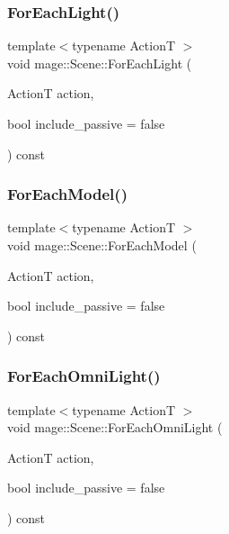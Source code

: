 \hypertarget{classmage_1_1_scene_a7ef0664366aa29c4dff89329d3fb5759}{}\label{classmage_1_1_scene_a7ef0664366aa29c4dff89329d3fb5759} 
\subsubsection{\texorpdfstring{For\+Each\+Light()}{ForEachLight()}}
{\footnotesize\ttfamily template$<$typename ActionT $>$ \\
void mage\+::\+Scene\+::\+For\+Each\+Light (\begin{DoxyParamCaption}\item[{ActionT}]{action,  }\item[{bool}]{include\+\_\+passive = {\ttfamily false} }\end{DoxyParamCaption}) const}

\hypertarget{classmage_1_1_scene_a6df0662b829691415f50ea1d45341582}{}\label{classmage_1_1_scene_a6df0662b829691415f50ea1d45341582} 
\subsubsection{\texorpdfstring{For\+Each\+Model()}{ForEachModel()}}
{\footnotesize\ttfamily template$<$typename ActionT $>$ \\
void mage\+::\+Scene\+::\+For\+Each\+Model (\begin{DoxyParamCaption}\item[{ActionT}]{action,  }\item[{bool}]{include\+\_\+passive = {\ttfamily false} }\end{DoxyParamCaption}) const}

\hypertarget{classmage_1_1_scene_a9dae59b09d5167d027fc4cf8f09b961c}{}\label{classmage_1_1_scene_a9dae59b09d5167d027fc4cf8f09b961c} 
\subsubsection{\texorpdfstring{For\+Each\+Omni\+Light()}{ForEachOmniLight()}}
{\footnotesize\ttfamily template$<$typename ActionT $>$ \\
void mage\+::\+Scene\+::\+For\+Each\+Omni\+Light (\begin{DoxyParamCaption}\item[{ActionT}]{action,  }\item[{bool}]{include\+\_\+passive = {\ttfamily false} }\end{DoxyParamCaption}) const}

